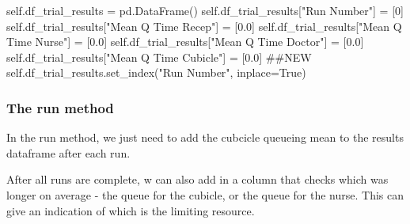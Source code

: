 \documentclass[
  letterpaper,
  DIV=11,
  numbers=noendperiod]{scrreprt}
\newenvironment{Shaded}{\begin{snugshade}}{\end{snugshade}}
\newcommand{\CommentTok}[1]{\textcolor[rgb]{0.37,0.37,0.37}{#1}}
\newcommand{\DecValTok}[1]{\textcolor[rgb]{0.68,0.00,0.00}{#1}}
\newcommand{\FloatTok}[1]{\textcolor[rgb]{0.68,0.00,0.00}{#1}}
\newcommand{\NormalTok}[1]{\textcolor[rgb]{0.00,0.23,0.31}{#1}}
\newcommand{\OperatorTok}[1]{\textcolor[rgb]{0.37,0.37,0.37}{#1}}
\newcommand{\StringTok}[1]{\textcolor[rgb]{0.13,0.47,0.30}{#1}}
\newcommand{\VariableTok}[1]{\textcolor[rgb]{0.07,0.07,0.07}{#1}}
\begin{document}
\begin{Shaded}
\begin{Highlighting}[]
\VariableTok{self}\NormalTok{.df\_trial\_results }\OperatorTok{=}\NormalTok{ pd.DataFrame()}
\VariableTok{self}\NormalTok{.df\_trial\_results[}\StringTok{"Run Number"}\NormalTok{] }\OperatorTok{=}\NormalTok{ [}\DecValTok{0}\NormalTok{]}
\VariableTok{self}\NormalTok{.df\_trial\_results[}\StringTok{"Mean Q Time Recep"}\NormalTok{] }\OperatorTok{=}\NormalTok{ [}\FloatTok{0.0}\NormalTok{]}
\VariableTok{self}\NormalTok{.df\_trial\_results[}\StringTok{"Mean Q Time Nurse"}\NormalTok{] }\OperatorTok{=}\NormalTok{ [}\FloatTok{0.0}\NormalTok{]}
\VariableTok{self}\NormalTok{.df\_trial\_results[}\StringTok{"Mean Q Time Doctor"}\NormalTok{] }\OperatorTok{=}\NormalTok{ [}\FloatTok{0.0}\NormalTok{]}
\VariableTok{self}\NormalTok{.df\_trial\_results[}\StringTok{"Mean Q Time Cubicle"}\NormalTok{] }\OperatorTok{=}\NormalTok{ [}\FloatTok{0.0}\NormalTok{] }\CommentTok{\#\#NEW}
\VariableTok{self}\NormalTok{.df\_trial\_results.set\_index(}\StringTok{"Run Number"}\NormalTok{, inplace}\OperatorTok{=}\VariableTok{True}\NormalTok{)}
\end{Highlighting}
\end{Shaded}

\subsubsection{The run method}\label{the-run-method-6}

In the run method, we just need to add the cubcicle queueing mean to the
results dataframe after each run.

After all runs are complete, w can also add in a column that checks
which was longer on average - the queue for the cubicle, or the queue
for the nurse. This can give an indication of which is the limiting
resource.
\end{document}
